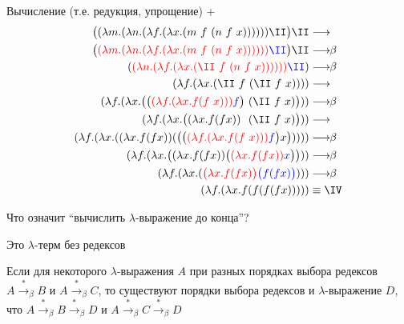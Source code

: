 \begin{frame}{Вычисление (т.е. редукция, упрощение) \II+\II}
\def\betaarr{\longrightarrow\!\!\beta}
\def\numTWO{\ensuremath{\lam{f}{\lam{x}{f(f\ x)}}}}
\vspace{-2em}
{\Large
  \begin{align}
    \App{\lam{m}{\lam{n}{\lam{f}{\lam{x}{\app{m\ f\ }{\app{n\ f\ }{x}} }}}}}{\II} \II & \longrightarrow \\
    \Redex{\lam{m}{\lam{n}{\lam{f}{\lam{x}{\app{m\ f\ }{\app{n\ f\ }{x}} }}}}}{\II} \II & \betaarr \\
    \redex{\lam{n}{\lam{f}{\lam{x}{\app{\II\ f\ }{\app{n\ f\ }{x}}){}}}}} {\II} & \betaarr \\
    \lam{f}{\lam{x}{ \app{\II\ f\ }{\app{\II\ f\ }{x}}}}   & \longrightarrow \\
    \lam{f}{\lam{x}{ \App{\Redex{\numTWO}{f}\ }{\app{\II\ f\ }{x}}}} & \betaarr \\
    \lam{f}{\lam{x}{ \App{\lam{x}{f (f x)} \ \ }{\app{\II\ f\ }{x}}}} & \longrightarrow \\
    \lam{f}{\lam{x}{ \app{\lam{x}{f (f x)}} {\app{\App{\Redex{\numTWO}{f}}{x}}}}} & \betaarr \\
    \lam{f}{\lam{x}{ \App{\lam{x}{f (f x)}  } {\Redex{\lam{x}{f (f x)} }{x}}}} & \betaarr \\
    \lam{f}{\lam{x}{ \redex{\Lam{x}{f (f x)}}{\App{f}{\app{f}{x}}}}} & \betaarr \\
    \lam{f}{\lam{x}{ f (f (f (f x)))}} & \equiv \IV
  \end{align}}
\end{frame}

\begin{frame}{Что означит \enquote{вычислить $\lambda$-выражение до конца}?}

\def\into{\ensuremath{\xrightarrow{\ *\ }_{\beta}}}
\vspace{-0.5em}
\begin{definition}
Это $\lambda$-терм без редексов
\end{definition}

\begin{theorem}
Если для некоторого $\lambda$-выражения $A$ при разных порядках выбора редексов
$A \into B$ и $A \into C$,
то существуют порядки выбора редексов и $\lambda$-выражение $D$, что $A\into B \into D$ и $A\into C \into D$
\end{theorem}
\end{frame}

